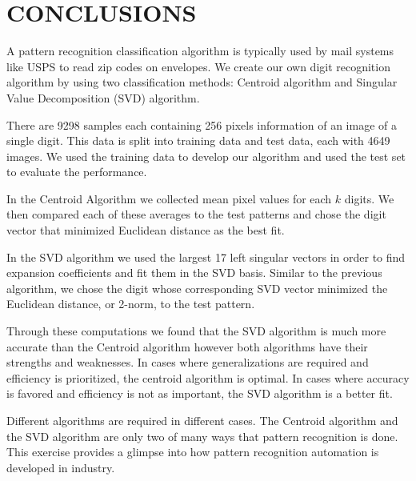 \documentclass[dvipsnames,12pt]{article} %
\begin{document}
    \vspace*{12pt}

  \section{CONCLUSIONS}
    \label{SECT 06:CONCLUSIONS}

    \vspace{06pt}
A pattern recognition classification algorithm is typically used by mail systems like USPS to read zip codes on envelopes. We create our own digit recognition algorithm by using two classification methods: Centroid algorithm and Singular Value Decomposition (SVD) algorithm.
\vspace{06pt}

There are 9298 samples each containing 256 pixels information of an image of a single digit. This data is split into training data and test data, each with 4649 images. We used the training data to develop our algorithm and used the test set to evaluate the performance.

\vspace{06pt}

In the Centroid Algorithm we collected mean pixel values for each $k$ digits. We then compared each of these averages to the test patterns and chose the digit vector that minimized Euclidean distance as the best fit. 

\vspace{06pt}

In the SVD algorithm we used the largest 17 left singular vectors in order to find expansion coefficients and fit them in the SVD basis. Similar to the previous algorithm, we chose the digit whose corresponding SVD vector minimized the Euclidean distance, or 2-norm, to the test pattern. 

\vspace{06pt}

Through these computations we found that the SVD algorithm is much more accurate than the Centroid algorithm however both algorithms have their strengths and weaknesses. In cases where generalizations are required and efficiency is prioritized, the centroid algorithm is optimal. In cases where accuracy is favored and efficiency is not as important, the SVD algorithm is a better fit.
    
\vspace{06pt}

Different algorithms are required in different cases. The Centroid algorithm and the SVD algorithm are only two of many ways that pattern recognition is done. This exercise provides a glimpse into how pattern recognition automation is developed in industry.
\end{document}
